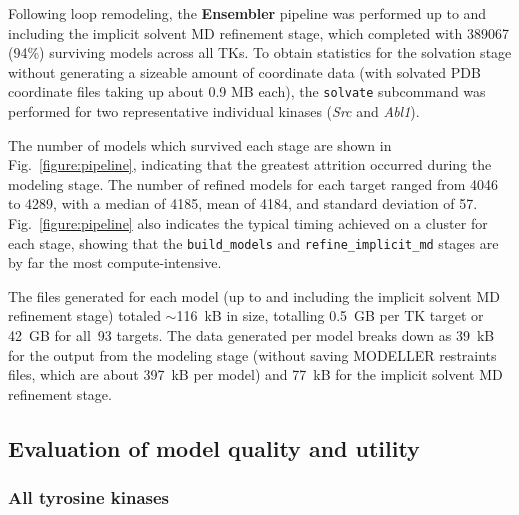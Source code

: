 \documentclass[aps,prl,preprint,nofootinbib,superscriptaddress,linenumbers]{revtex4-1}
\begin{document}
Following loop remodeling, the {\bf Ensembler} pipeline was performed up to and including the implicit solvent MD refinement stage, which completed with \num{389067} (94\%) surviving models across all TKs.
To obtain statistics for the solvation stage without generating a sizeable amount of coordinate data (with solvated PDB coordinate files taking up about 0.9 MB each), the {\tt solvate} subcommand was performed for two representative individual kinases (\emph{Src} and \emph{Abl1}).

The number of models which survived each stage are shown in Fig.~\ref{figure:pipeline}, indicating that the greatest attrition occurred during the modeling stage.
The number of refined models for each target ranged from \num{4046} to \num{4289}, with a median of \num{4185}, mean of \num{4184}, and standard deviation of \num{57}.
Fig.~\ref{figure:pipeline} also indicates the typical timing achieved on a cluster for each stage, showing that the {\tt build\_models} and {\tt refine\_implicit\_md} stages are by far the most compute-intensive.

The files generated for each model (up to and including the implicit solvent MD refinement stage) totaled $\sim$116~kB in size, totalling 0.5~GB per TK target or 42~GB for all~93 targets.
The data generated per model breaks down as 39~kB for the output from the modeling stage (without saving MODELLER restraints files, which are about 397~kB per model) and 77~kB for the implicit solvent MD refinement stage.

\subsection*{Evaluation of model quality and utility}

\subsubsection*{All tyrosine kinases}


\end{document}
